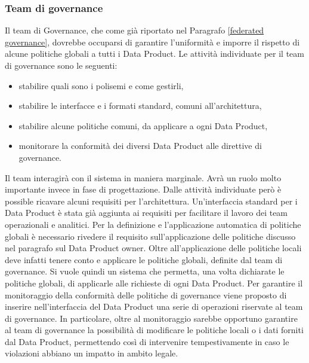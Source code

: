 \documentclass[a4paper,12pt]{report}
\begin{document}
\subsubsection{Team di governance}
Il team di Governance, che come già riportato nel Paragrafo \ref{federated governance}, dovrebbe occuparsi di garantire l'uniformità e imporre il rispetto di alcune politiche globali a tutti i Data Product. 
Le attività individuate per il team di governance sono le seguenti:
\begin{itemize}
    \item stabilire quali sono i polisemi e come gestirli,
    \item stabilire le interfacce e i formati standard, comuni all'architettura,
    \item stabilire alcune politiche comuni, da applicare a ogni Data Product,
    \item monitorare la conformità dei diversi Data Product alle direttive di governance.
\end{itemize}
Il team interagirà con il sistema in maniera marginale. 
Avrà un ruolo molto importante invece in fase di progettazione.
Dalle attività individuate però è possible ricavare alcuni requisiti per l'architettura.
Un'interfaccia standard per i Data Product è stata già aggiunta ai requisiti per facilitare il lavoro dei team operazionali e analitici.
Per la definizione e l'applicazione automatica di politiche globali è necessario rivedere il requisito sull'applicazione delle politiche discusso nel paragrafo sul Data Product owner.
Oltre all'applicazione delle politiche locali deve infatti tenere conto e applicare le politiche globali, definite dal team di governance. 
Si vuole quindi un sistema che permetta, una volta dichiarate le politiche globali, di applicarle alle richieste di ogni Data Product.
Per garantire il monitoraggio della conformità delle politiche di governance viene proposto di inserire nell'interfaccia del Data Product una serie di operazioni riservate al team di governance.
In particolare, oltre al monitoraggio sarebbe opportuno garantire al team di governance la possibilità di modificare le politiche locali o i dati forniti dal Data Product, permettendo così di intervenire tempestivamente in caso le violazioni abbiano un impatto in ambito legale.
\end{document}
